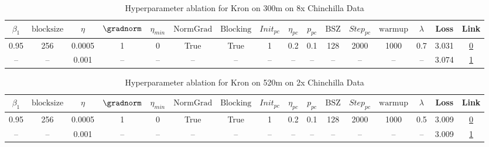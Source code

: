 \begin{table}[H]
\centering
\caption{Hyperparameter ablation for Kron on 300m on 8x Chinchilla Data}
\label{tab:ablation_kron_300m_on_8x_chinchilla_data}
\begin{tabular}{cccccccccccccccc}
\toprule
$\beta_1$ & $\mathrm{block size}$ & $\eta$ & $\gradnorm$ & $\eta_{min}$ & $\mathrm{NormGrad}$ & $\mathrm{Blocking}$ & $Init_{pc}$ & $\eta_{pc}$ & $p_{pc}$ & $\mathrm{BSZ}$ & $Step_{pc}$ & $\mathrm{warmup}$ & $\lambda$ & Loss & Link \\
\midrule
0.95 & 256 & 0.0005 & 1 & 0 & True & True & 1 & 0.2 & 0.1 & 128 & 2000 & 1000 & 0.7 & 3.031 & \href{https://wandb.ai/stanford-mercury/optimizer-scaling/runs/sweep-300m-48B-kronabb76feelr0.0005-wd0.7-b10.95-plr0.2-pis1-gn1-0ed5c4}{0} \\
\midrule
-- & -- & 0.001 & -- & -- & -- & -- & -- & -- & -- & -- & -- & -- & -- & 3.074 & \href{https://wandb.ai/stanford-mercury/optimizer-scaling/runs/sweep-300m-48B-kronk1aa5b2lr0.001-wd0.7-b10.95-plr0.2-pis1-gn1-n-e34850}{1} \\
\bottomrule
\end{tabular}
\end{table}

\begin{table}[H]
\centering
\caption{Hyperparameter ablation for Kron on 520m on 2x Chinchilla Data}
\label{tab:ablation_kron_520m_on_2x_chinchilla_data}
\begin{tabular}{cccccccccccccccc}
\toprule
$\beta_1$ & $\mathrm{block size}$ & $\eta$ & $\gradnorm$ & $\eta_{min}$ & $\mathrm{NormGrad}$ & $\mathrm{Blocking}$ & $Init_{pc}$ & $\eta_{pc}$ & $p_{pc}$ & $\mathrm{BSZ}$ & $Step_{pc}$ & $\mathrm{warmup}$ & $\lambda$ & Loss & Link \\
\midrule
0.95 & 256 & 0.0005 & 1 & 0 & True & True & 1 & 0.2 & 0.1 & 128 & 2000 & 1000 & 0.5 & 3.009 & \href{https://wandb.ai/stanford-mercury/optimizer-scaling/runs/sweep-520m-21B-krona6b124lr0.0005-wd0.5-b10.95-plr0.2-pis1-gn1-n-6acf07}{0} \\
\midrule
-- & -- & 0.001 & -- & -- & -- & -- & -- & -- & -- & -- & -- & -- & -- & 3.009 & \href{https://wandb.ai/stanford-mercury/optimizer-scaling/runs/sweep-520m-21B-kron680ae4lr0.001-wd0.5-b10.95-plr0.2-pis1-gn1-no-405d3d}{1} \\
\bottomrule
\end{tabular}
\end{table}

